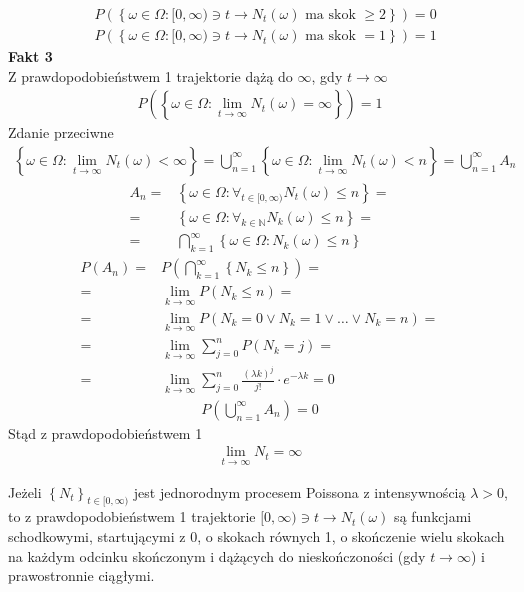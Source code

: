 \begin{align*}
&P\left(\left\{\omega\in\Omega:[0,\infty )\ni t\to N_t(\omega)\text{ ma skok }\ge 2\right\}\right)=0\\
&P\left(\left\{\omega\in\Omega:[0,\infty )\ni t\to N_t(\omega)\text{ ma skok }=1\right\}\right)=1
\end{align*}
\textbf{Fakt 3}\\
Z prawdopodobieństwem 1 trajektorie dążą do $ \infty  $, gdy $ t\to\infty  $
\begin{gather*}
P\left(\left\{\omega\in\Omega:\lim\limits_{t\to\infty} N_t(\omega)=\infty \right\}\right)=1
\end{gather*}
Zdanie przeciwne
\begin{gather*}
\left\{\omega\in\Omega:\lim\limits_{t\to\infty} N_t(\omega)<\infty \right\}
=
\bigcup_{n=1}^{\infty }
\left\{\omega\in\Omega:\lim\limits_{t\to\infty} N_t(\omega)<n \right\}
=
\bigcup_{n=1}^{\infty }A_n
\end{gather*}
\begin{align*}
A_n=&
\left\{\omega\in\Omega:\forall_{t\in[0,\infty )} N_t(\omega)\le n \right\}
=\\=&
\left\{\omega\in\Omega:\forall_{k\in \mathbb N } N_k(\omega)\le n \right\}
=\\=&
\bigcap_{k=1}^{\infty }
\left\{\omega\in\Omega: N_k(\omega)\le n \right\}
\end{align*}
\begin{align*}
P\left(A_n\right)=&
P\left(\bigcap_{k=1}^{\infty }\left\{N_k\le n\right\}\right)
=\\=&
\lim\limits_{k\to\infty}
P\left(N_k\le n\right)
=\\=&
\lim\limits_{k\to\infty}
P\left(N_k=0\vee N_k=1\vee\dots\vee N_k=n\right)
=\\=&
\lim\limits_{k\to\infty}
\sum_{j=0}^{n}P\left(N_k=j\right)
=\\=&
\lim\limits_{k\to\infty}
\sum_{j=0}^{n} \frac{(\lambda k)^j}{j!}\cdot e^{-\lambda k}=0
\end{align*}
\begin{gather*}
P\left(\bigcup_{n=1}^{\infty }A_n\right)=0
\end{gather*}
Stąd z prawdopodobieństwem 1
\begin{gather*}
\lim\limits_{t\to\infty} N_t=\infty 
\end{gather*}
\begin{twr}
Jeżeli $ \left\{N_t\right\}_{t\in[0,\infty )} $ jest jednorodnym procesem Poissona z intensywnością $ \lambda>0 $, to z prawdopodobieństwem 1 trajektorie $ [0,\infty )\ni t\to N_t(\omega) $ są funkcjami schodkowymi, startującymi z 0, o skokach równych 1, o skończenie wielu skokach na każdym odcinku skończonym i dążących do nieskończoności (gdy $ t\to\infty $) i prawostronnie ciągłymi.
\end{twr}\noindent

